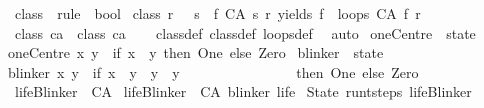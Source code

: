 \begin{isabellebody}
\isanewline
{}\isamarkupfalse%
\ class{}\ {\isacharcolon}{\isacharcolon}\ {\isachardoublequoteopen}rule\ {\isasymRightarrow}\ bool{\isachardoublequoteclose}\ \isanewline
{\isachardoublequoteopen}class{}\ r\ {\isasymequiv}\ {\isacharparenleft}{\isasymforall}\ s{\isachardot}\ {\isacharparenleft}{\isasymexists}\ f{\isachardot}\ {\isacharparenleft}CA\ s\ r{\isacharparenright}\ yields\ f\ {\isasymand}\ loops\ {\isacharparenleft}CA\ f\ r{\isacharparenright}{\isacharparenright}{\isacharparenright}{\isachardoublequoteclose}\isanewline
\isanewline
{}\isamarkupfalse%
\ {\isachardoublequoteopen}class{}\ ca\ {\isasymLongrightarrow}\ class{}\ ca{\isachardoublequoteclose}\isanewline
%
\isadelimproof
\ \ %
\endisadelimproof
%
\isatagproof
{}\isamarkupfalse%
\ class{}{\isacharunderscore}def\ class{}{\isacharunderscore}def\ loops{\isacharunderscore}def\ \isamarkupfalse%
\ auto%
\endisatagproof
{\isafoldproof}%
%
\isadelimproof
%
\endisadelimproof
%
\isadelimdocument
%
\endisadelimdocument
%
\isatagdocument
%
\isamarkuptrue%
%
\endisatagdocument
{\isafolddocument}%
%
\isadelimdocument
%
\endisadelimdocument
{}\isamarkupfalse%
\ oneCentre\ {\isacharcolon}{\isacharcolon}\ state\ \isanewline
{\isachardoublequoteopen}oneCentre\ x\ y\ {\isacharequal}\ {\isacharparenleft}if\ x{\isacharequal}{}\ {\isasymand}\ y{\isacharequal}{}\ then\ One\ else\ Zero{\isacharparenright}{\isachardoublequoteclose}\isanewline
\isanewline
{}\isamarkupfalse%
\ blinker\ {\isacharcolon}{\isacharcolon}\ state\ \isanewline
{\isachardoublequoteopen}blinker\ x\ y\ {\isacharequal}\ {\isacharparenleft}if\ x{\isacharequal}{}\ {\isasymand}\ {\isacharparenleft}y{\isacharequal}{\isacharminus}{}\ {\isasymor}\ y{\isacharequal}{}\ {\isasymor}\ y{\isacharequal}{}{\isacharparenright}\isanewline
\ \ \ \ \ \ \ \ \ \ \ \ \ \ \ \ then\ One\ else\ Zero{\isacharparenright}{\isachardoublequoteclose}\isanewline
\isanewline
{}\isamarkupfalse%
\ lifeBlinker\ {\isacharcolon}{\isacharcolon}\ CA\ \isanewline
{\isachardoublequoteopen}lifeBlinker\ {\isasymequiv}\ CA\ blinker\ life{\isachardoublequoteclose}\isanewline
\isanewline
{}\isamarkupfalse%
\ {\isachardoublequoteopen}State\ {\isacharparenleft}run{\isacharunderscore}t{\isacharunderscore}steps\ lifeBlinker\ {}{\isacharparenright}\ {\isacharparenleft}{}{\isacharparenright}\ {\isacharparenleft}{}{\isacharparenright}{\isachardoublequoteclose}\isanewline
\isanewline
\isanewline
%
\isadelimtheory
\ \ \isanewline
%
\endisadelimtheory
%
\isatagtheory
{}\isamarkupfalse%
%
\endisatagtheory
{\isafoldtheory}%
%
\isadelimtheory
%
\endisadelimtheory
%
\end{isabellebody}%
